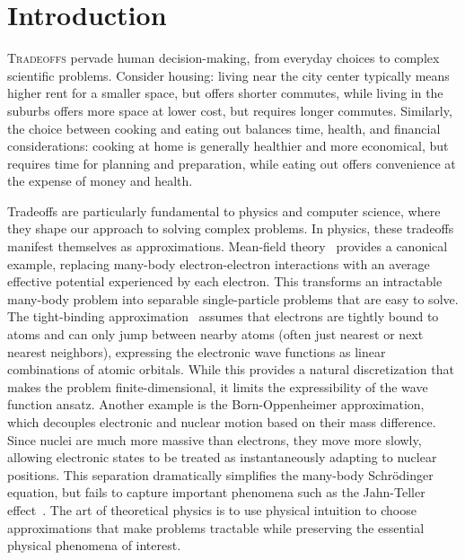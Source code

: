 \cleartoverso
\thispagestyle{empty}%
\BgThisPage
\clearpage
\chapter{Introduction}\label{ch:intro}
\BgThisPage

\lettrine[lines=3]{T}{radeoffs} pervade human decision-making, from everyday choices to complex scientific problems. Consider housing: living near the city center typically means higher rent for a smaller space, but offers shorter commutes, while living in the suburbs offers more space at lower cost, but requires longer commutes. Similarly, the choice between cooking and eating out balances time, health, and financial considerations: cooking at home is generally healthier and more economical, but requires time for planning and preparation, while eating out offers convenience at the expense of money and health.

Tradeoffs are particularly fundamental to physics and computer science, where they shape our approach to solving complex problems. In physics, these tradeoffs manifest themselves as approximations. Mean-field theory~\cite{Bruus2004ManyBody} provides a canonical example, replacing many-body electron-electron interactions with an average effective potential experienced by each electron. This transforms an intractable many-body problem into separable single-particle problems that are easy to solve. The tight-binding approximation~\cite{Kittel2005IntroductionTo,Vonsov2012QuantumSolidS} assumes that electrons are tightly bound to atoms and can only jump between nearby atoms (often just nearest or next nearest neighbors), expressing the electronic wave functions as linear combinations of atomic orbitals. While this provides a natural discretization that makes the problem finite-dimensional, it limits the expressibility of the wave function ansatz. Another example is the Born-Oppenheimer approximation, which decouples electronic and nuclear motion based on their mass difference. Since nuclei are much more massive than electrons, they move more slowly, allowing electronic states to be treated as instantaneously adapting to nuclear positions. This separation dramatically simplifies the many-body Schrödinger equation, but fails to capture important phenomena such as the Jahn-Teller effect~\cite{Vonsov2012QuantumSolidS}. The art of theoretical physics is to use physical intuition to choose approximations that make problems tractable while preserving the essential physical phenomena of interest.

